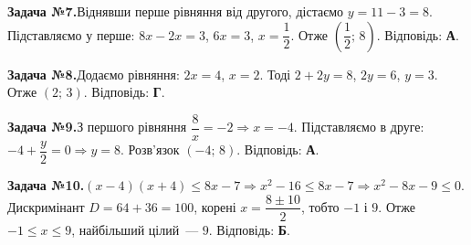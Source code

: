 \documentclass[12pt]{article}
\begin{document}
\par\vspace{0.3cm}\noindent\hypertarget{sol:7}{}
\begin{tcolorbox}[colback=titleBg!40, colframe=mainGreen!55, boxrule=0.4pt, arc=2pt, left=6pt, right=6pt, top=4pt, bottom=4pt, breakable]
\noindent\small\textbf{Задача №7.}\quad Віднявши перше рівняння від другого, дістаємо $y=11-3=8$. Підставляємо у перше: $8x-2x=3$, $6x=3$, $x=\dfrac{1}{2}$. Отже $\left(\dfrac{1}{2};\,8\right)$. Відповідь: \textbf{А}.
\par\vspace{0.1cm}\hfill\hyperlink{task:7}{}
\end{tcolorbox}
\par\vspace{0.3cm}\noindent\hypertarget{sol:8}{}
\begin{tcolorbox}[colback=titleBg!40, colframe=mainGreen!55, boxrule=0.4pt, arc=2pt, left=6pt, right=6pt, top=4pt, bottom=4pt, breakable]
\noindent\small\textbf{Задача №8.}\quad Додаємо рівняння: $2x=4$, $x=2$. Тоді $2+2y=8$, $2y=6$, $y=3$. Отже $(2;\,3)$. Відповідь: \textbf{Г}.
\par\vspace{0.1cm}\hfill\hyperlink{task:8}{}
\end{tcolorbox}
\par\vspace{0.3cm}\noindent\hypertarget{sol:9}{}
\begin{tcolorbox}[colback=titleBg!40, colframe=mainGreen!55, boxrule=0.4pt, arc=2pt, left=6pt, right=6pt, top=4pt, bottom=4pt, breakable]
\noindent\small\textbf{Задача №9.}\quad З першого рівняння $\dfrac{8}{x}=-2\Rightarrow x=-4$. Підставляємо в друге: $-4+\dfrac{y}{2}=0\Rightarrow y=8$. Розв'язок $(-4;\,8)$. Відповідь: \textbf{А}.
\par\vspace{0.1cm}\hfill\hyperlink{task:9}{}
\end{tcolorbox}
\par\vspace{0.3cm}\noindent\hypertarget{sol:10}{}
\begin{tcolorbox}[colback=titleBg!40, colframe=mainGreen!55, boxrule=0.4pt, arc=2pt, left=6pt, right=6pt, top=4pt, bottom=4pt, breakable]
\noindent\small\textbf{Задача №10.}\quad $(x-4)(x+4)\le 8x-7 \Rightarrow x^2-16\le 8x-7 \Rightarrow x^2-8x-9\le 0$. Дискримінант $D=64+36=100$, корені $x=\dfrac{8\pm 10}{2}$, тобто $-1$ і $9$. Отже $-1\le x\le 9$, найбільший цілий~--- $9$. Відповідь: \textbf{Б}.
\par\vspace{0.1cm}\hfill\hyperlink{task:10}{}
\end{tcolorbox}
\end{document}
